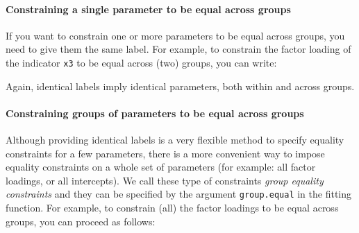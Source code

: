 \begin{Shaded}
\begin{Highlighting}[]
\ErrorTok{~}\StringTok{ }\OperatorTok{+}\StringTok{ }\NormalTok{(}\NormalTok{,}\NormalTok{,}\NormalTok{,}\NormalTok{)}\OperatorTok{*}\OperatorTok{+}\StringTok{ }
\end{Highlighting}
\end{Shaded}

\hypertarget{constraining-a-single-parameter-to-be-equal-across-groups}{%
\paragraph{Constraining a single parameter to be equal across
groups}\label{constraining-a-single-parameter-to-be-equal-across-groups}}

If you want to constrain one or more parameters to be equal across
groups, you need to give them the same label. For example, to constrain
the factor loading of the indicator \texttt{x3} to be equal across (two)
groups, you can write:

\begin{Shaded}
\begin{Highlighting}[]
\end{Highlighting}
\end{Shaded}

Again, identical labels imply identical parameters, both within and
across groups.

\hypertarget{constraining-groups-of-parameters-to-be-equal-across-groups}{%
\paragraph{Constraining groups of parameters to be equal across
groups}\label{constraining-groups-of-parameters-to-be-equal-across-groups}}

Although providing identical labels is a very flexible method to specify
equality constraints for a few parameters, there is a more convenient
way to impose equality constraints on a whole set of parameters (for
example: all factor loadings, or all intercepts). We call these type of
constraints \emph{group equality constraints} and they can be specified
by the argument \texttt{group.equal} in the fitting function. For
example, to constrain (all) the factor loadings to be equal across
groups, you can proceed as follows:

